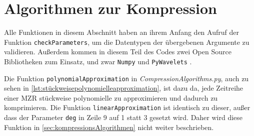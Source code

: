 \section{Algorithmen zur Kompression}\label{sec:kompressionsAlgorithmen}
Alle Funktionen in diesem Abschnitt haben an ihrem Anfang den Aufruf der Funktion \lstinline|checkParameters|, um die Datentypen der übergebenen Argumente zu validieren. Außerdem kommen in diesem Teil des Codes zwei Open Source Bibliotheken zum Einsatz, und zwar \lstinline|Numpy| \cite{numpy} und \lstinline|PyWavelets| \cite{pyWavelets}.

Die Funktion \lstinline|polynomialApproximation| in \textit{CompressionAlgorithms.py}, auch zu sehen in \autoref{lst:stückweisepolynomielleapproximation}, ist dazu da, jede Zeitreihe einer \ac{MZR} stückweise polynomielle zu approximieren und dadurch zu komprimieren. Die Funktion \lstinline|linearApproximation| ist identisch zu dieser, außer dass der Parameter \lstinline|deg| in Zeile 9 auf 1 statt 3 gesetzt wird. Daher wird diese Funktion in \autoref{sec:kompressionsAlgorithmen} nicht weiter beschrieben.

